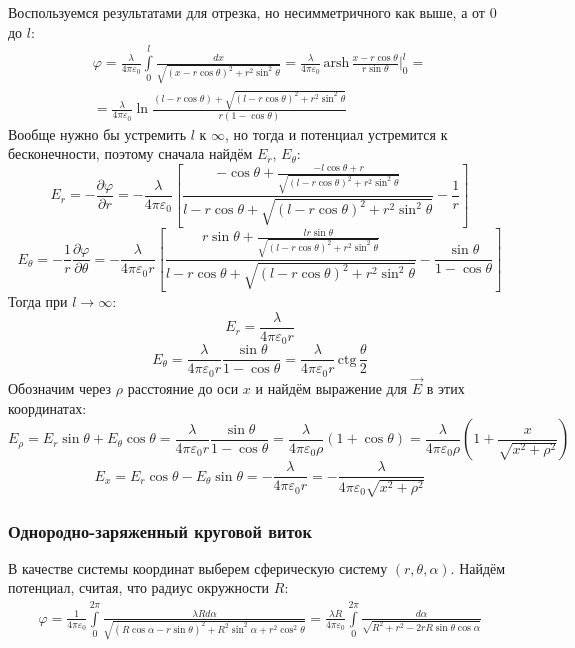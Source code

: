 Воспользуемся результатами для отрезка, но несимметричного как выше, а от 0 до $l$:
\[
\begin{gathered}
\varphi 
= 
\frac{\lambda}{4\pi\varepsilon_0} \int\limits_{0}^{l} \frac{dx}{\sqrt{(x - r \cos \theta)^2 + r^2 \sin^2 \theta}} 
=
\frac{\lambda}{4\pi\varepsilon_0} \mathrm{\,arsh\,} \frac{x - r \cos \theta}{r \sin \theta} \Big|_{0}^{l} 
= \\ =
\frac{\lambda}{4\pi\varepsilon_0} \ln \frac{(l - r \cos \theta) + \sqrt{(l - r \cos \theta)^2 + r^2 \sin^2 \theta}}{r(1 - \cos \theta)}
\end{gathered}
\]
Вообще нужно бы устремить $l$ к $\infty$, но тогда и потенциал устремится к бесконечности, поэтому сначала найдём $E_r$, $E_\theta$:
\[
	E_r = - \frac{\partial \varphi}{\partial r} = 
	- \frac{\lambda}{4\pi\varepsilon_0} \left[
		\frac{- \cos \theta + \frac{- l \cos \theta + r}{\sqrt{(l - r \cos \theta)^2 + r^2 \sin^2 \theta}}}{l - r \cos \theta + \sqrt{(l - r \cos \theta)^2 + r^2 \sin^2 \theta}} - \frac{1}{r}
	\right]
\]
\[
	E_\theta = - \frac{1}{r}\frac{\partial \varphi}{\partial \theta} = 
	- \frac{\lambda}{4\pi\varepsilon_0 r} \left[
	\frac{r \sin \theta + \frac{l r \sin \theta}{\sqrt{(l - r \cos \theta)^2 + r^2 \sin^2 \theta}}}{l - r \cos \theta + \sqrt{(l - r \cos \theta)^2 + r^2 \sin^2 \theta}} - \frac{\sin \theta}{1 - \cos \theta}
	\right]
\]
Тогда при $l \to \infty$:
\[
	E_r = \frac{\lambda}{4\pi\varepsilon_0 r}
\]
\[
	E_\theta = \frac{\lambda}{4\pi\varepsilon_0 r} \frac{\sin \theta}{1 - \cos \theta} = \frac{\lambda}{4\pi\varepsilon_0 r} \mathrm{\,ctg\,} \frac{\theta}{2}
\]
Обозначим через $\rho$ расстояние до оси $x$ и найдём выражение для $\vec{E}$ в этих координатах:
\[
	E_\rho = E_r \sin \theta + E_\theta \cos \theta = \frac{\lambda}{4\pi \varepsilon_0 r} \frac{\sin \theta}{1 - \cos \theta} =
	\frac{\lambda}{4\pi \varepsilon_0 \rho} (1 + \cos \theta) = \frac{\lambda}{4\pi \varepsilon_0 \rho} \left(1 + \frac{x}{\sqrt{x^2 + \rho^2}}\right)
\]
\[
	E_x = E_r \cos \theta - E_\theta \sin \theta = - \frac{\lambda}{4\pi \varepsilon_0 r} =
	- \frac{\lambda}{4\pi \varepsilon_0 \sqrt{x^2 + \rho^2}} 
\]

\subsubsection{Однородно-заряженный круговой виток}

В качестве системы координат выберем сферическую систему $(r, \theta, \alpha)$. Найдём потенциал, считая, что радиус окружности $R$:
\[
	\begin{gathered}
	\varphi = \frac{1}{4\pi\varepsilon_0} \int\limits_{0}^{2\pi} \frac{\lambda R d\alpha}{\sqrt{(R \cos \alpha - r \sin \theta)^2 + R^2 \sin^2 \alpha + r^2 \cos^2 \theta}} = 
	\frac{\lambda R}{4\pi\varepsilon_0} \int\limits_{0}^{2\pi} \frac{d\alpha}{\sqrt{R^2 + r^2 - 2 r R \sin \theta \cos \alpha}}
	\end{gathered}
\]

